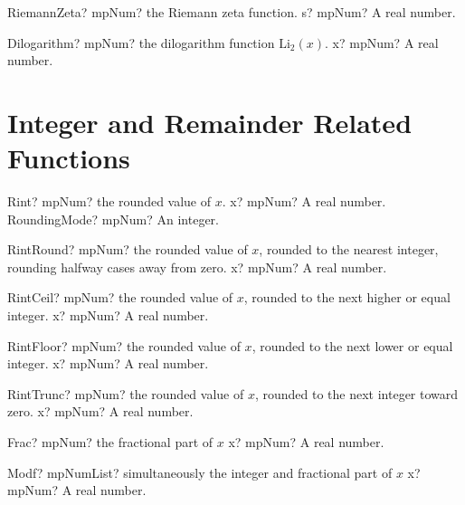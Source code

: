 \documentclass[12pt,a4paper,openany]{book}
\begin{document}
\begin{mpFunctionsExtract}
\mpFunctionOne
{RiemannZeta? mpNum? the Riemann zeta function.}
{s? mpNum? A real number.}
\end{mpFunctionsExtract}

\begin{mpFunctionsExtract}
\mpFunctionOne
{Dilogarithm? mpNum? the dilogarithm function $\text{Li}_2(x)$.}
{x? mpNum? A real number.}
\end{mpFunctionsExtract}

\section{Integer and Remainder Related Functions}

\begin{mpFunctionsExtract}
\mpFunctionOne
{Rint? mpNum? the rounded value of $x$.}
{x? mpNum? A real number.}
{RoundingMode? mpNum? An integer.}
\end{mpFunctionsExtract}

\begin{mpFunctionsExtract}
\mpFunctionOne
{RintRound? mpNum? the rounded value of $x$, rounded to the nearest integer, rounding halfway cases away from zero.}
{x? mpNum? A real number.}
\end{mpFunctionsExtract}

\begin{mpFunctionsExtract}
\mpFunctionOne
{RintCeil? mpNum? the rounded value of $x$, rounded to the next higher or equal integer.}
{x? mpNum? A real number.}
\end{mpFunctionsExtract}

\begin{mpFunctionsExtract}
\mpFunctionOne
{RintFloor? mpNum? the rounded value of $x$, rounded to the next lower or equal integer.}
{x? mpNum? A real number.}
\end{mpFunctionsExtract}

\begin{mpFunctionsExtract}
\mpFunctionOne
{RintTrunc? mpNum? the rounded value of $x$, rounded to the next integer toward zero.}
{x? mpNum? A real number.}
\end{mpFunctionsExtract}

\begin{mpFunctionsExtract}
\mpFunctionOne
{Frac? mpNum? the fractional part of $x$}
{x? mpNum? A real number.}
\end{mpFunctionsExtract}

\begin{mpFunctionsExtract}
\mpFunctionOne
{Modf? mpNumList? simultaneously the integer and fractional part of $x$}
{x? mpNum? A real number.}
\end{mpFunctionsExtract}
\end{document}
